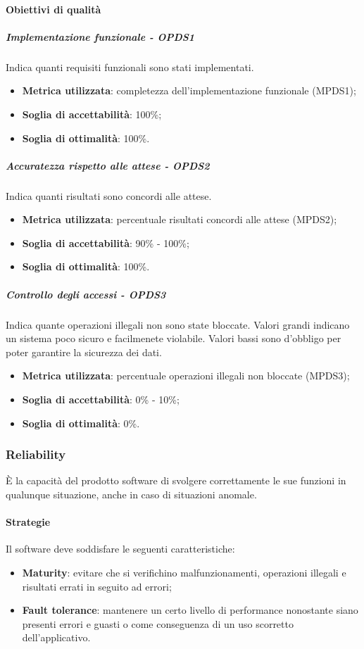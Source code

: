 \documentclass[PdQ.tex]{subfiles}
\begin{document}
			\paragraph{Obiettivi di qualità}
				\subparagraph{Implementazione funzionale - OPDS1}
				Indica quanti requisiti funzionali sono stati implementati.
				\begin{itemize}
					\item \textbf{Metrica utilizzata}: completezza dell'implementazione funzionale (MPDS1);
					\item \textbf{Soglia di accettabilità}: 100\%;
					\item \textbf{Soglia di ottimalità}: 100\%.
				\end{itemize}
				
				\subparagraph{Accuratezza rispetto alle attese - OPDS2}
				Indica quanti risultati sono concordi alle attese.
				\begin{itemize}
					\item \textbf{Metrica utilizzata}: percentuale risultati concordi alle attese (MPDS2);
					\item \textbf{Soglia di accettabilità}: 90\% - 100\%;
					\item \textbf{Soglia di ottimalità}: 100\%.
				\end{itemize}
				
				\subparagraph{Controllo degli accessi - OPDS3}
				Indica quante operazioni illegali non sono state bloccate. Valori grandi indicano un sistema poco sicuro e facilmenete violabile.
				Valori bassi sono d'obbligo per poter garantire la sicurezza dei dati.
				\begin{itemize}
					\item \textbf{Metrica utilizzata}: percentuale operazioni illegali non bloccate (MPDS3);
					\item \textbf{Soglia di accettabilità}: 0\% - 10\%;
					\item \textbf{Soglia di ottimalità}: 0\%.
				\end{itemize}
		
		\subsubsection{Reliability}
		È la capacità del prodotto software di svolgere correttamente le sue funzioni in qualunque situazione, anche in caso di situazioni anomale.
		
			\paragraph{Strategie}
			Il software deve soddisfare le seguenti caratteristiche:
			\begin{itemize}
				\item \textbf{Maturity}: evitare che si verifichino malfunzionamenti, operazioni illegali e risultati errati in seguito ad errori;
				\item \textbf{Fault tolerance}: mantenere un certo livello di performance nonostante siano presenti errori e guasti o come conseguenza di un uso scorretto dell'applicativo.
			\end{itemize}
			
\end{document}
